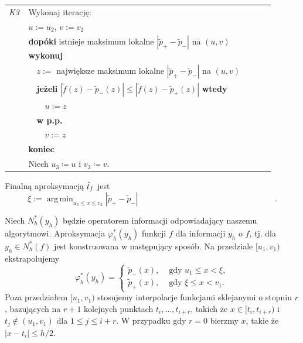 \documentclass[oik, pdftex, man]{mgrwms}
\DeclareMathOperator*{\argmin}{arg\,min}
\begin{document}
    \begin{table}[H]
        \begin{tabular}{p{0.045\linewidth} p{0.85\linewidth}}
        \textit{K3} & Wykonaj iterację: \\
                        & $u := u_2$, $v := v_2$ \\
                        & \textbf{dopóki} istnieje maksimum lokalne $|\tilde{p}_{+} - \tilde{p}_{-}|$ na $(u,v)$ \textbf{wykonuj} \\
                        & $\quad$$z :=$ największe maksimum lokalne $|\tilde{p}_{+} - \tilde{p}_{-}|$ na $(u,v)$ \\
                        & $\quad$\textbf{jeżeli} $|\tilde{f}(z) - \tilde{p}_{-}(z)| \leq |\tilde{f}(z) - \tilde{p}_{+}(z)|$ \textbf{wtedy} \\
                        & $\quad\quad$$u:= z$ \\
                        & $\quad$\textbf{w p.p.} \\
                        & $\quad\quad$$v:= z$ \\
                        & \textbf{koniec} \\
                        & Niech $u_3 \coloneqq u$ i $v_3 \coloneqq v$.
        \end{tabular}
    \end{table}

    Finalną aproksymacją $\hat{t}_f$ jest
    \begin{equation*}
            \xi := \argmin_{u_3 \leq x \leq v_3}|\tilde{p}_{+} - \tilde{p}_{-}| \hspace{200pt}.
    \end{equation*}

    Niech $N_{h}^{*}(y_{h})$ będzie operatorem informacji odpowiadający naszemu algorytmowi. Aproksymacja $\varphi_{h}^{*}(y_{h})$ funkcji $f$ dla informacji $y_{h}$ o $f$, tj. dla $y_{h} \in N_{h}^{*}(f)$ jest konstruowana w następujący sposób. Na przedziale $[u_{1}, v_{1})$ ekstrapolujemy
    \begin{equation*}
        \varphi_{h}^{*}\left(y_{h}\right)= \begin{cases}
            \tilde{p}_{-}(x),  &\text { gdy } u_{1} \leq x< \xi, \\
            \tilde{p}_{+}(x),  &\text { gdy } \xi \leq x<v_{1}.
        \end{cases}
    \end{equation*}
    Poza przedziałem $[u_{1}, v_{1})$ stosujemy interpolacje funkcjami sklejanymi o stopniu $r$, bazujących na $r+1$ kolejnych punktach $t_{i}, \ldots, t_{i+r}$, takich że $x \in [t_{i},t_{i+r})$ i $t_{j} \notin (u_{1},v_{1})$ dla $1 \leq j \leq i+r$. W przypadku gdy $r=0$ bierzmy $x$, takie że $|x-t_{i}| \leq h/2$.
\end{document}
